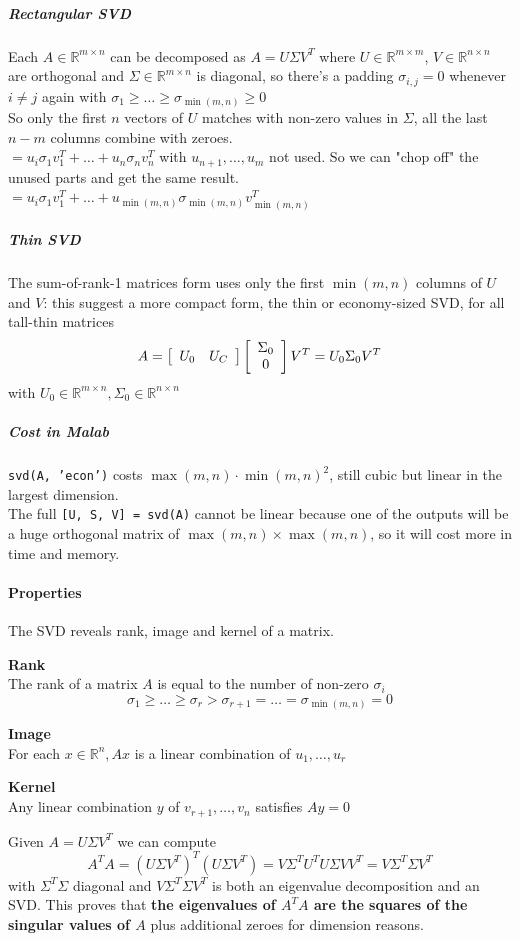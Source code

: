 \documentclass[10pt]{report}
\begin{document}
\subparagraph{Rectangular SVD} Each $A\in \mathbb{R}^{m\times n}$ can be decomposed as $A = U\Sigma V^T$ where $U\in \mathbb{R}^{m\times m}$, $V \in \mathbb{R}^{n\times n}$ are orthogonal and $\Sigma\in \mathbb{R}^{m\times n}$ is diagonal, so there's a padding $\sigma_{i,j} = 0$ whenever $i\neq j$ again with $\sigma_1 \geq \ldots \geq \sigma_{\min(m, n)} \geq 0$\\
So only the first $n$ vectors of $U$ matches with non-zero values in $\Sigma$, all the last $n-m$ columns combine with zeroes.\\
$= u_i\sigma_1 v_1^T + \ldots + u_n \sigma_n v_n^T$ with $u_{n+1},\ldots, u_m$ not used. So we can "chop off" the unused parts and get the same result.\\
$= u_i\sigma_1 v_1^T + \ldots + u_{\min(m, n)} \sigma_{\min(m, n)} v_{\min(m, n)}^T$
\subparagraph{Thin SVD} The sum-of-rank-1 matrices form uses only the first $\min(m,n)$ columns of $U$ and $V$: this suggest a more compact form, the thin or economy-sized SVD, for all tall-thin matrices
$$A= \left[\begin{array}{c c}
U_0 & U_C
\end{array}\right]\left[\begin{array}{c}
\Sigma_0\\0
\end{array}\right]V^T=U_0\Sigma_0V^T$$
with $U_0\in\mathbb{R}^{m\times n},\Sigma_0\in\mathbb{R}^{n\times n}$
\subparagraph{Cost in Malab} \texttt{svd(A, 'econ')} costs $\max(m,n)\cdot \min(m,n)^2$, still cubic but linear in the largest dimension.\\
The full \texttt{[U, S, V] = svd(A)} cannot be linear because one of the outputs will be a huge orthogonal matrix of $\max(m,n)\times \max(m,n)$, so it will cost more in time and memory.
\paragraph{Properties} The SVD reveals rank, image and kernel of a matrix.
\begin{list}{}{}
	\item \textbf{Rank}\\
The rank of a matrix $A$ is equal to the number of non-zero $\sigma_i$ $$\sigma_1\geq \ldots\geq\sigma_r > \sigma_{r+1} = \ldots = \sigma_{\min(m,n)} = 0$$
	\item \textbf{Image}\\
	For each $x\in\mathbb{R}^n, Ax$ is a linear combination of $u_1,\ldots,u_r$
	\item \textbf{Kernel}\\
	Any linear combination $y$ of $v_{r+1},\ldots,v_n$ satisfies $Ay = 0$
\end{list}
Given $A = U\Sigma V^T$ we can compute $$A^T A = (U\Sigma V^T)^T(U\Sigma V^T) = V\Sigma^T U^T U \Sigma VV^T = V\Sigma^T \Sigma V^T$$ with $\Sigma^T \Sigma$ diagonal and $V\Sigma^T \Sigma V^T$ is both an eigenvalue decomposition and an SVD. This proves that \textbf{the eigenvalues of $A^T A$ are the squares of the singular values of $A$} plus additional zeroes for dimension reasons.
\end{document}
